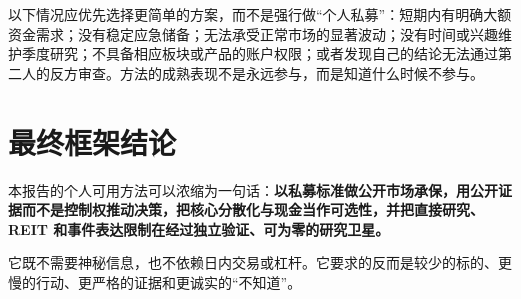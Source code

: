 以下情况应优先选择更简单的方案，而不是强行做“个人私募”：短期内有明确大额资金需求；没有稳定应急储备；无法承受正常市场的显著波动；没有时间或兴趣维护季度研究；不具备相应板块或产品的账户权限；或者发现自己的结论无法通过第二人的反方审查。方法的成熟表现不是永远参与，而是知道什么时候不参与。

\section{最终框架结论}

本报告的个人可用方法可以浓缩为一句话：\textbf{以私募标准做公开市场承保，用公开证据而不是控制权推动决策，把核心分散化与现金当作可选性，并把直接研究、REIT 和事件表达限制在经过独立验证、可为零的研究卫星。}

它既不需要神秘信息，也不依赖日内交易或杠杆。它要求的反而是较少的标的、更慢的行动、更严格的证据和更诚实的“不知道”。
